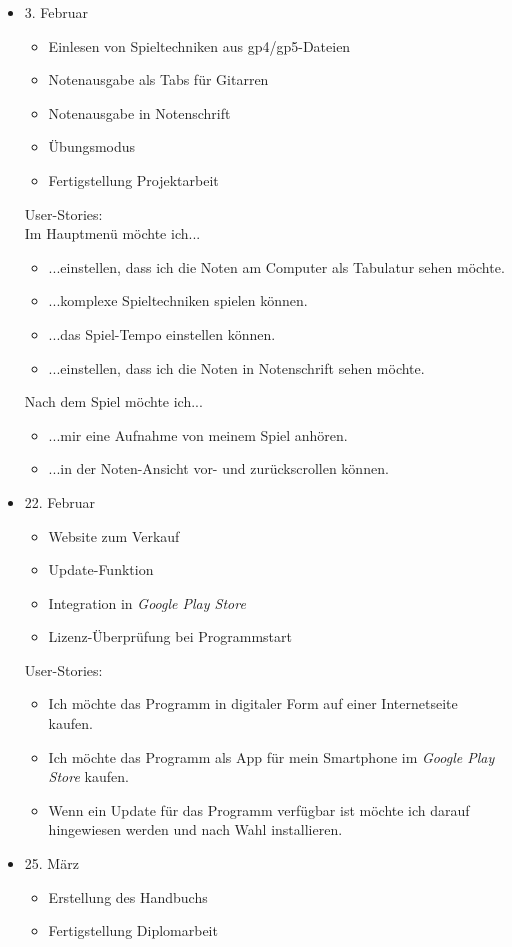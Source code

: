 \documentclass[12pt,a4paper]{report}
\begin{document}
\begin{itemize}
    \item 3. Februar
      \begin{itemize}
      \item Einlesen von Spieltechniken aus gp4/gp5-Dateien
      \item Notenausgabe als Tabs für Gitarren
      \item Notenausgabe in Notenschrift
      \item Übungsmodus
      \item Fertigstellung Projektarbeit
      \end{itemize}
	  User-Stories:\\
      Im Hauptmenü möchte ich...
      \begin{itemize}
      \item[D] ...einstellen, dass ich die Noten am Computer als Tabulatur sehen möchte.
      \item[D] ...komplexe Spieltechniken spielen können.
      \item[D] ...das Spiel-Tempo einstellen können.
      \item[P] ...einstellen, dass ich die Noten in Notenschrift sehen möchte.
      \end{itemize}
      
      Nach dem Spiel möchte ich...
      \begin{itemize}
      \item[D] ...mir eine Aufnahme von meinem Spiel anhören.
      \item[D] ...in der Noten-Ansicht vor- und zurückscrollen können.
      \end{itemize}
      
    \item 22. Februar
      \begin{itemize}
        \item Website zum Verkauf
        \item Update-Funktion
        \item Integration in \emph{Google Play Store}
        \item Lizenz-Überprüfung bei Programmstart
      \end{itemize}
      
      User-Stories:
      \begin{itemize}
      \item[D] Ich möchte das Programm in digitaler Form auf einer Internetseite kaufen.
      \item[D] Ich möchte das Programm als App für mein Smartphone im \emph{Google Play Store} kaufen.
      \item[D] Wenn ein Update für das Programm verfügbar ist möchte ich darauf hingewiesen werden und nach Wahl installieren.
      \end{itemize}
      
    \item 25. März
      \begin{itemize}
      \item Erstellung des Handbuchs
      \item Fertigstellung Diplomarbeit
      \end{itemize}
    \end{itemize}  
      
\end{document}
